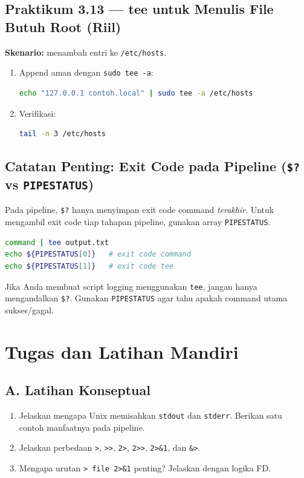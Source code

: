 \subsection*{Praktikum 3.13 --- tee untuk Menulis File Butuh Root (Riil)}
\textbf{Skenario:} menambah entri ke \texttt{/etc/hosts}.

\begin{enumerate}
    \item Append aman dengan \texttt{sudo tee -a}:
\begin{lstlisting}[language=bash, caption={Append ke /etc/hosts}]
echo "127.0.0.1 contoh.local" | sudo tee -a /etc/hosts
\end{lstlisting}

    \item Verifikasi:
\begin{lstlisting}[language=bash, caption={Cek hosts}]
tail -n 3 /etc/hosts
\end{lstlisting}
\end{enumerate}

\subsection*{Catatan Penting: Exit Code pada Pipeline (\texttt{\$?} vs \texttt{PIPESTATUS})}
Pada pipeline, \texttt{\$?} hanya menyimpan exit code command \textit{terakhir}.
Untuk mengambil exit code tiap tahapan pipeline, gunakan array \texttt{PIPESTATUS}.

\begin{lstlisting}[language=bash, caption={PIPESTATUS untuk cek exit code pipeline}]
command | tee output.txt
echo ${PIPESTATUS[0]}   # exit code command
echo ${PIPESTATUS[1]}   # exit code tee
\end{lstlisting}

\begin{warningbox}
Jika Anda membuat script logging menggunakan \texttt{tee}, jangan hanya mengandalkan \texttt{\$?}.
Gunakan \texttt{PIPESTATUS} agar tahu apakah command utama sukses/gagal.
\end{warningbox}

\section{Tugas dan Latihan Mandiri}
\label{sec:tasks-io}

\subsection*{A. Latihan Konseptual}
\begin{enumerate}
    \item Jelaskan mengapa Unix memisahkan \texttt{stdout} dan \texttt{stderr}. Berikan satu contoh manfaatnya pada pipeline.
    \item Jelaskan perbedaan \texttt{>}, \texttt{>>}, \texttt{2>}, \texttt{2>>}, \texttt{2>\&1}, dan \texttt{\&>}.
    \item Mengapa urutan \texttt{> file 2>\&1} penting? Jelaskan dengan logika FD.
\end{enumerate}

